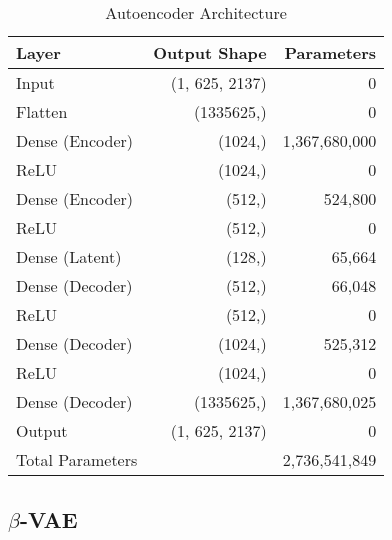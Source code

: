 \begin{table}[!h]
    \centering
    \begin{tabular}{lrr}
        \toprule
        Layer & Output Shape & Parameters \\
        \midrule
        Input & (1, 625, 2137) & 0 \\
        Flatten & (1335625,) & 0 \\
        Dense (Encoder) & (1024,) & 1,367,680,000 \\
        ReLU & (1024,) & 0 \\
        Dense (Encoder) & (512,) & 524,800 \\
        ReLU & (512,) & 0 \\
        Dense (Latent) & (128,) & 65,664 \\
        Dense (Decoder) & (512,) & 66,048 \\
        ReLU & (512,) & 0 \\
        Dense (Decoder) & (1024,) & 525,312 \\
        ReLU & (1024,) & 0 \\
        Dense (Decoder) & (1335625,) & 1,367,680,025 \\
        Output & (1, 625, 2137) & 0 \\
        \midrule
        Total Parameters & & 2,736,541,849 \\
        \bottomrule
    \end{tabular}
    \caption{Autoencoder Architecture}
    \label{tab:ae}
\end{table}


\subsection{$\beta$-VAE}
\label{app:a-vae}

